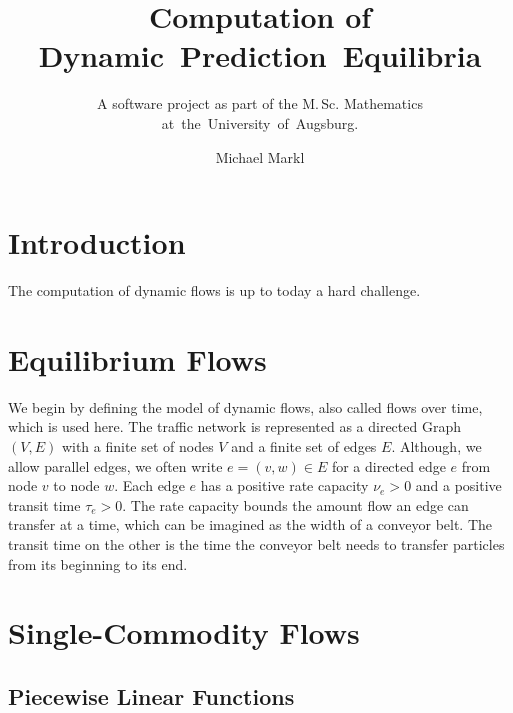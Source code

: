 \documentclass[titlepage]{scrartcl}
\author{Michael Markl}
\title{Computation of Dynamic~Prediction~Equilibria}
\subtitle{A software project as part of the M.\,Sc. Mathematics at~the~University~of~Augsburg.}
\newcommand{\capa}{\nu}
\newcommand{\transit}{\tau}
\begin{document}
    \maketitle

    \newpage
    \tableofcontents

    \newpage
    \section{Introduction}

    The computation of dynamic flows is up to today a hard challenge.

    \newpage
    \section{Equilibrium Flows}

    We begin by defining the model of dynamic flows, also called flows over time, which is used here.
    The traffic network is represented as a directed Graph $(V, E)$ with a finite set of nodes $V$ and a finite set of edges $E$.
    Although, we allow parallel edges, we often write $e=(v,w)\in E$ for a directed edge $e$ from node $v$ to node $w$.
    Each edge $e$ has a positive rate capacity $\capa_e > 0$ and a positive transit time $\transit_e > 0$.
    The rate capacity bounds the amount flow an edge can transfer at a time, which can be imagined as the width of a conveyor belt.
    The transit time on the other is the time the conveyor belt needs to transfer particles from its beginning to its end.

    
    

    \newpage
    \section{Single-Commodity Flows}

    \subsection{Piecewise Linear Functions}
\end{document}
